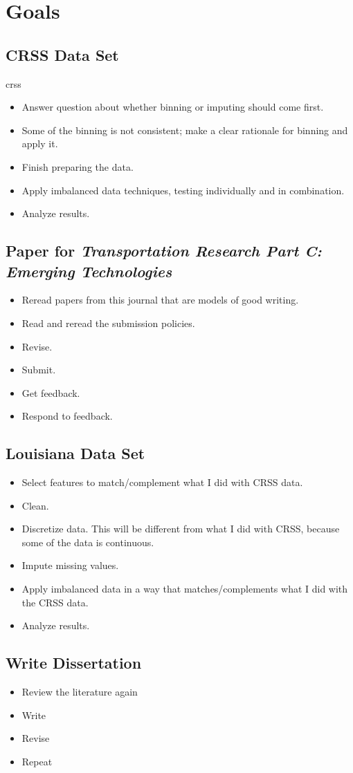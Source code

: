 \section{Goals}

\subsection{CRSS Data Set}

\acrfull{crss} \cite {CRSS}

\begin{itemize}
	\item Answer question about whether binning or imputing should come first.
	\item Some of the binning is not consistent; make a clear rationale for binning and apply it.
	\item Finish preparing the data.
	\item Apply imbalanced data techniques, testing individually and in combination.
	\item Analyze results.
\end{itemize}

\subsection{Paper for {\it Transportation Research Part C:  Emerging Technologies}}

\begin{itemize}
	\item Reread papers from this journal that are models of good writing.
	\item Read and reread the submission policies.
	\item Revise.
	\item Submit.
	\item Get feedback.
	\item Respond to feedback.
\end{itemize}	

\subsection{Louisiana Data Set}

\begin{itemize}
	\item Select features to match/complement what I did with CRSS data.
	\item Clean.
	\item Discretize data.  This will be different from what I did with CRSS, because some of the data is continuous.
	\item Impute missing values.
	\item Apply imbalanced data in a way that matches/complements what I did with the CRSS data.
	\item Analyze results.
\end{itemize}

\subsection{Write Dissertation}

\begin{itemize}
	\item Review the literature again
	\item Write
	\item Revise
	\item Repeat
\end{itemize}


